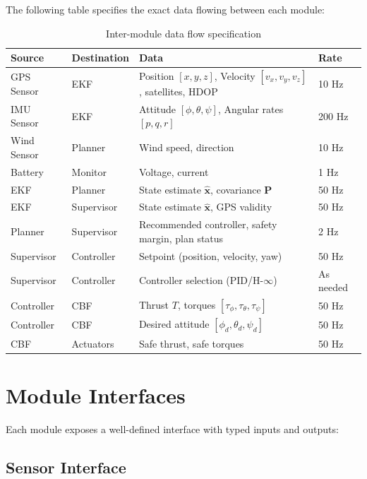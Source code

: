 The following table specifies the exact data flowing between each module:

\begin{table}[htbp]
    \centering
    \caption{Inter-module data flow specification}
    \label{tab:dataflow}
    \small
    \begin{tabularx}{\textwidth}{@{}llXl@{}}
        \toprule
        \textbf{Source} & \textbf{Destination} & \textbf{Data} & \textbf{Rate} \\
        \midrule
        GPS Sensor & EKF & Position $[x,y,z]$, Velocity $[v_x,v_y,v_z]$, satellites, HDOP & 10 Hz \\
        IMU Sensor & EKF & Attitude $[\phi,\theta,\psi]$, Angular rates $[p,q,r]$ & 200 Hz \\
        Wind Sensor & Planner & Wind speed, direction & 10 Hz \\
        Battery & Monitor & Voltage, current & 1 Hz \\
        \midrule
        EKF & Planner & State estimate $\hat{\mathbf{x}}$, covariance $\mathbf{P}$ & 50 Hz \\
        EKF & Supervisor & State estimate $\hat{\mathbf{x}}$, GPS validity & 50 Hz \\
        \midrule
        Planner & Supervisor & Recommended controller, safety margin, plan status & 2 Hz \\
        Supervisor & Controller & Setpoint (position, velocity, yaw) & 50 Hz \\
        Supervisor & Controller & Controller selection (PID/H-$\infty$) & As needed \\
        \midrule
        Controller & CBF & Thrust $T$, torques $[\tau_\phi, \tau_\theta, \tau_\psi]$ & 50 Hz \\
        Controller & CBF & Desired attitude $[\phi_d, \theta_d, \psi_d]$ & 50 Hz \\
        \midrule
        CBF & Actuators & Safe thrust, safe torques & 50 Hz \\
        \bottomrule
    \end{tabularx}
\end{table}

\section{Module Interfaces}

Each module exposes a well-defined interface with typed inputs and outputs:

\subsection{Sensor Interface}

